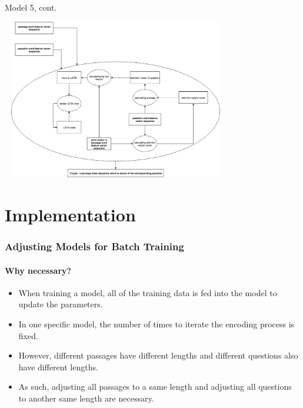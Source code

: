 \documentclass{beamer}
\begin{document}
\begin{frame}{Model 5, cont.}
    \begin{center}
        \includegraphics[width=10cm, height=7cm]{figures/model5_encoder.png}
    \end{center}
\end{frame}

\section{Implementation}

\begin{frame} \frametitle{Adjusting Models for Batch Training}\framesubtitle{Why necessary?}
    \begin{itemize}
        \item When training a model, all of the training data is fed into the model to update the parameters.
        \item In one specific model, the number of times to iterate the encoding process is fixed.
        \item However, different passages have different lengths and different questions also have different lengths.
        \item As such, adjusting all passages to a same length and adjusting all questions to another same length are necessary.
    \end{itemize}
\end{frame}
\end{document}
